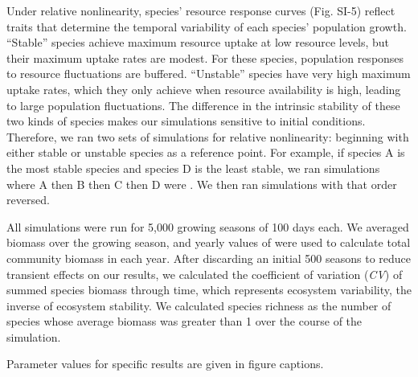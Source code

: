 \documentclass[12pt,]{article}
\begin{document}
Under relative nonlinearity, species' resource response curves (Fig.
SI-5) reflect traits that determine the temporal variability of each
species' population growth. ``Stable'' species achieve maximum resource
uptake at low resource levels, but their maximum uptake rates are
modest. For these species, population responses to resource fluctuations
are buffered. ``Unstable'' species have very high maximum uptake rates,
which they only achieve when resource availability is high, leading to
large population fluctuations. The difference in the intrinsic stability
of these two kinds of species makes our simulations sensitive to initial
conditions. Therefore, we ran two sets of simulations for relative
nonlinearity: beginning with either stable or unstable species as a
reference point. For example, if species A is the most stable species
and species D is the least stable, we ran simulations where A then B
then C then D were . We then
ran simulations with that order reversed.

All simulations were run for 5,000 growing seasons of 100 days each. We
averaged biomass over the growing season, and yearly values of
 were used to calculate total community biomass
in each year. After discarding an initial 500 seasons to reduce
transient effects on our results, we calculated the coefficient of
variation (\emph{CV}) of summed species biomass through time, which
represents ecosystem variability, the inverse of ecosystem stability. We
calculated  species richness as the number of species
whose average biomass was greater than 1 over the course of the
simulation.

Parameter values for specific results are given in figure captions.
\end{document}
